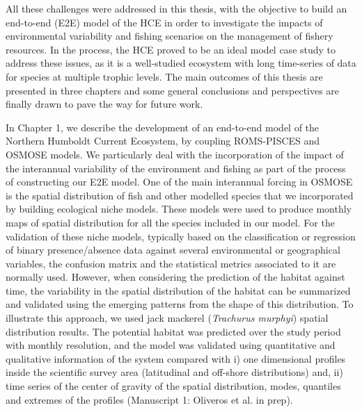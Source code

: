 All these challenges were addressed in this thesis, with the objective to build an end-to-end (E2E) model of the HCE in order to investigate the impacts of environmental variability and fishing scenarios on the management of fishery resources. In the process, the HCE proved to be an ideal model case study to address these issues, as it is a well-studied ecosystem with long time-series of data for species at multiple trophic levels. The main outcomes of this thesis are presented in three chapters and some general conclusions and perspectives are finally drawn to pave the way for future work.

In Chapter 1, we describe the development of an end-to-end model of the Northern Humboldt Current Ecosystem, by coupling ROMS-PISCES and OSMOSE models. We particularly deal with the incorporation of the impact of the interannual variability of the environment and fishing as part of the process of constructing our E2E model. One of the main interannual forcing in OSMOSE is the spatial distribution of fish and other modelled species that we incorporated by building ecological niche models. These models were used to produce monthly maps of spatial distribution for all the species included in our model. For the validation of these niche models, typically based on the classification or regression of binary presence/absence data against several environmental or geographical variables, the confusion matrix and the statistical metrics associated to it are normally used. However, when considering the prediction of the habitat against time, the variability in the spatial distribution of the habitat can be summarized and validated using the emerging patterns from the shape of this distribution. To illustrate this approach, we used jack mackerel (\emph{Trachurus murphyi}) spatial distribution results. The potential habitat was predicted over the study period with monthly resolution, and the model was validated using quantitative and qualitative information of the system compared with i) one dimensional profiles inside the scientific survey area (latitudinal and off-shore distributions) and, ii) time series of the center of gravity of the spatial distribution, modes, quantiles and extremes of the profiles (Manuscript 1: Oliveros et al. in prep). 

